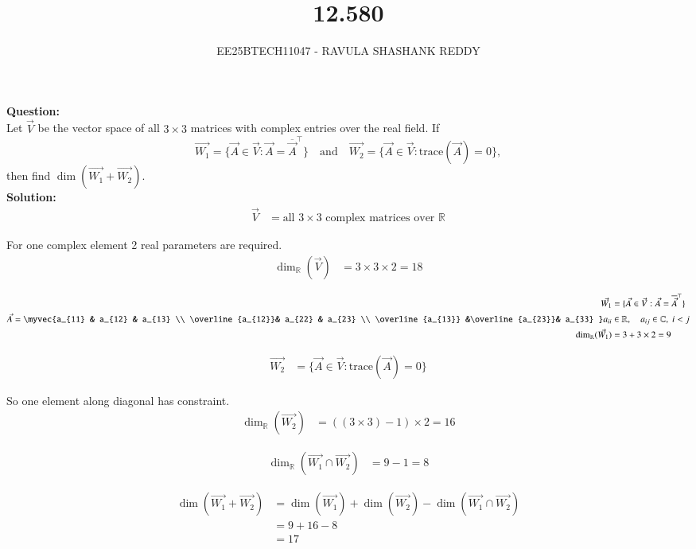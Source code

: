 \documentclass[journal]{article}
\begin{document}
	
	
	\vspace{3cm}
	
\title{12.580}
\author{EE25BTECH11047 - RAVULA SHASHANK REDDY}
\maketitle
\hrulefill
\bigskip 

\renewcommand{\thetable}{\theenumi}
\setlength{\intextsep}{10pt}

\textbf{Question:} \\

Let \(\vec{V}\) be the vector space of all \(3 \times 3\) matrices with complex entries over the real field. If  
\[
\vec{W_1} = \{\vec{A} \in \vec{V} : \vec{A} = \overline{\vec{A}}^\top \} \quad \text{and} \quad \vec{W_2} = \{\vec{A} \in \vec{V} : \mathrm{trace}(\vec{A}) = 0\},
\]  
then find \(\dim(\vec{W_1} + \vec{W_2})\).\\


\textbf{Solution:}
\begin{align}
\vec{V} &= \text{all } 3 \times 3 \text{ complex matrices over } \mathbb{R} 
\end{align}

For one complex element 2 real parameters are required.
\begin{align}
\dim_\mathbb{R}(\vec{V}) &= 3 \times 3 \times 2 = 18
\end{align}

\begin{align}
\vec{W_1} &= \{\vec{A} \in \vec{V}: \vec{A} = \overline{\vec{A}}^\top \} \\
\vec{A} = \myvec{a_{11} & a_{12} & a_{13} \\
\overline{a_{12}}& a_{22} & a_{23} \\
\overline{a_{13}} &\overline{a_{23}}& a_{33} }
a_{ii} &\in \mathbb{R}, \quad a_{ij} \in \mathbb{C}, \; i<j \\
\dim_\mathbb{R}(\vec{W_1}) &= 3 + 3 \times 2 = 9
\end{align}

\begin{align}
\vec{W_2} &= \{\vec{A} \in \vec{V}: \mathrm{trace}(\vec{A}) = 0\} 
\end{align}

So one element along diagonal has constraint.
\begin{align}
\dim_\mathbb{R}(\vec{W_2}) &= ((3 \times 3)-1) \times 2  = 16
\end{align}

\begin{align}
\dim_\mathbb{R}(\vec{W_1} \cap \vec{W_2}) &= 9 - 1 = 8
\end{align}

\begin{align}
\dim(\vec{W_1} + \vec{W_2}) &= \dim(\vec{W_1}) + \dim(\vec{W_2}) - \dim(\vec{W_1} \cap \vec{W_2}) \\
&= 9 + 16 - 8 \\
&= 17
\end{align}
\end{document}
